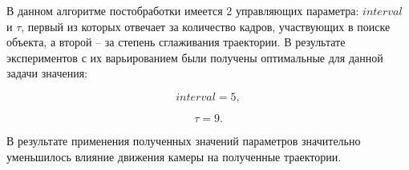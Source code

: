 В данном алгоритме постобработки имеется 2 управляющих параметра: $interval$ и $\tau$, первый из которых отвечает за количество кадров, участвующих в поиске объекта, а второй -- за степень сглаживания траектории. В результате экспериментов с их варьированием были получены оптимальные для данной задачи значения:

\begin{equation}
    interval = 5,
\end{equation}

\begin{equation}
    \tau = 9.
\end{equation}

В результате применения полученных значений параметров значительно уменьшилось влияние движения камеры на полученные траектории.
